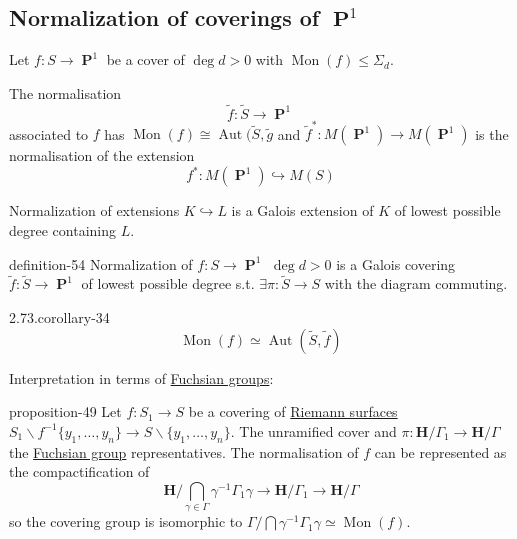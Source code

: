\documentclass[10pt,]{book}
\numberwithin{equation}{section}
\newcommand{\inv}{^{-1}}
\newcommand{\HH}{\mathbf{H}}
\DeclareMathOperator{\PP}{\mathbf{P}}
\DeclareMathOperator{\Aut}{Aut}
\newcommand{\gt}{>}
\begin{document}
\subsection[{Normalization of coverings of \(\PP^1\)}]{Normalization of coverings of \(\PP^1\)}\label{subsection-52}
\hypertarget{p-589}{}%
Let \(f\colon S \to \PP^1\) be a cover of \(\deg d \gt 0\) with \(\operatorname{Mon}(f) \le \Sigma_d\).%
\par
\hypertarget{p-590}{}%
The normalisation%
\begin{equation*}
\tilde f \colon \tilde S \to \PP^1
\end{equation*}
associated to \(f\) has \(\operatorname{Mon} (f) \cong \Aut( \tilde S, \tilde g\) and \(\tilde f ^* \colon M(\PP^1 ) \to M(\PP^1) \) is the normalisation of the extension%
\begin{equation*}
f^* \colon M(\PP^1 ) \hookrightarrow M(S)
\end{equation*}
%
\par
\hypertarget{p-591}{}%
Normalization of extensions \(K \hookrightarrow L\) is a Galois extension of \(K \) of lowest possible degree containing \(L\).%
\begin{definition}{}{definition-54}%
\hypertarget{p-592}{}%
Normalization of \(f\colon S\to \PP^1\) \(\deg d \gt 0 \) is a Galois covering \(\tilde f \colon \tilde S \to \PP^1 \) of  lowest possible degree s.t. \(\exists \pi \colon \tilde S \to S\) with  the diagram commuting.%
\end{definition}
\begin{corollary}{2.73.}{}{corollary-34}%
\hypertarget{p-593}{}%
%
\begin{equation*}
\operatorname{Mon}(f)  \simeq \Aut(\tilde S, \tilde f)
\end{equation*}
%
\end{corollary}
\hypertarget{p-594}{}%
Interpretation in terms of \hyperref[def-fuchsian-group]{Fuchsian groups}:%
\begin{proposition}{}{}{proposition-49}%
\hypertarget{p-595}{}%
Let \(f\colon S_1 \to S\) be a covering of \hyperref[def-top-riem-surface]{Riemann surfaces} \(S_1\smallsetminus f\inv \{ y_1, \ldots, y_n \} \to S \smallsetminus\{ y_1, \ldots, y_n \}\). The unramified cover and \(\pi \colon \HH/ \Gamma_1 \to \HH/ \Gamma\) the \hyperref[def-fuchsian-group]{Fuchsian group} representatives. The normalisation of \(f\) can be represented as the compactification of%
\begin{equation*}
\HH/ \bigcap_{\gamma \in \Gamma} \gamma \inv \Gamma_1 \gamma \to \HH/\Gamma_1 \to \HH/\Gamma
\end{equation*}
so the covering group is isomorphic to \(\Gamma/ \bigcap \gamma \inv \Gamma_1 \gamma \simeq \operatorname{Mon}(f)\).%
\end{proposition}
\end{document}
